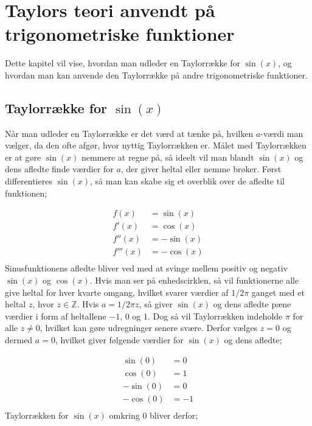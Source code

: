 \chapter{Taylors teori anvendt på trigonometriske funktioner}

Dette kapitel vil vise, hvordan man udleder en Taylorrække for $\sin(x)$, og hvordan man kan anvende den Taylorrække på andre trigonometriske funktioner.

\section{Taylorrække for $\sin(x)$}

Når man udleder en Taylorrække er det værd at tænke på, hvilken $a$-værdi man vælger, da den ofte afgør, hvor nyttig Taylorrækken er. Målet med Taylorrækken er at gøre $\sin(x)$ nemmere at regne på, så ideelt vil man blandt $\sin(x)$ og dens afledte finde værdier for $a$, der giver heltal eller nemme brøker. Først differentieres $\sin(x)$, så man kan skabe sig et overblik over de afledte til funktionen;

\begin{align*}
f(x) &= \sin(x) \\
f'(x) &= \cos(x) \\
f''(x) &= -\sin(x) \\
f'''(x) &= -\cos(x) \\
\end{align*}
Sinusfunktionens afledte bliver ved med at svinge mellem positiv og negativ $\sin(x)$ og $\cos(x)$. Hvis man ser på enhedscirklen, så vil funktionerne alle give heltal for hver kvarte omgang, hvilket svarer værdier af $1/2\pi$ ganget med et heltal $z$, hvor $z\in\mathbb{Z}$. Hvis $a=1/2\pi z$, så giver $\sin(x)$ og dens afledte pæne værdier i form af heltallene $-1$, $0$ og $1$. Dog så vil Taylorrækken indeholde $\pi$ for alle $z \neq 0$, hvilket kan gøre udregninger senere svære. Derfor vælges $z=0$ og dermed $a=0$, hvilket giver følgende værdier for $\sin(x)$ og dens afledte;

\begin{align*}
\sin(0) &= 0 \\
\cos(0) &= 1 \\
-\sin(0) &= 0 \\
-\cos(0) &= -1 \\
\end{align*}
Taylorrækken for $\sin(x)$ omkring $0$ bliver derfor;

